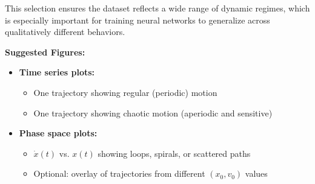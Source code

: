 \documentclass{article}
\begin{document}
This selection ensures the dataset reflects a wide range of dynamic regimes, which is especially important for training neural networks to generalize across qualitatively different behaviors.

\vspace{0.3cm}
\textbf{Suggested Figures:}
\begin{itemize}
    \item \textbf{Time series plots:}
    \begin{itemize}
        \item One trajectory showing regular (periodic) motion
        \item One trajectory showing chaotic motion (aperiodic and sensitive)
    \end{itemize}
    \item \textbf{Phase space plots:}
    \begin{itemize}
        \item $\dot{x}(t)$ vs. $x(t)$ showing loops, spirals, or scattered paths
        \item Optional: overlay of trajectories from different $(x_0, v_0)$ values
    \end{itemize}
\end{itemize}

\end{document}
